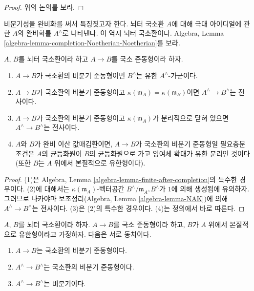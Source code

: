 \begin{proof}
위의 논의를 보라.
\end{proof}

\noindent
비분기성을 완비화를 써서 특징짓고자 한다. 뇌터 국소환 $A$에 대해
극대 아이디얼에 관한 $A$의 완비화를 $A^\wedge$로 나타낸다.
이 역시 뇌터 국소환이다. Algebra, Lemma
\ref{algebra-lemma-completion-Noetherian-Noetherian}를 보라.

\begin{lemma}
\label{lemma-unramified-completions}
$A$, $B$를 뇌터 국소환이라 하고 $A \to B$를 국소 준동형이라 하자.
\begin{enumerate}
\item $A \to B$가 국소환의 비분기 준동형이면 $B^\wedge$는
유한 $A^\wedge$-가군이다.
\item $A \to B$가 국소환의 비분기 준동형이고
$\kappa(\mathfrak m_A) = \kappa(\mathfrak m_B)$이면
$A^\wedge \to B^\wedge$는 전사이다.
\item $A \to B$가 국소환의 비분기 준동형이고
$\kappa(\mathfrak m_A)$가 분리적으로 닫혀 있으면
$A^\wedge \to B^\wedge$는 전사이다.
\item $A$와 $B$가 완비 이산 값매김환이면, $A \to B$가 국소환의
비분기 준동형일 필요충분조건은 $A$의 균등화원이 $B$의 균등화원으로
가고 잉여체 확대가 유한 분리인 것이다(또한 $B$는 $A$ 위에서
본질적으로 유한형이다).
\end{enumerate}
\end{lemma}

\begin{proof}
(1)은 Algebra, Lemma
\ref{algebra-lemma-finite-after-completion}의 특수한 경우이다.
(2)에 대해서는 $\kappa(\mathfrak m_A)$-벡터공간
$B^\wedge/\mathfrak m_{A^\wedge}B^\wedge$가 $1$에 의해 생성됨에
유의하자. 그러므로 나카야마 보조정리(Algebra, Lemma
\ref{algebra-lemma-NAK})에 의해 $A^\wedge \to B^\wedge$는 전사이다.
(3)은 (2)의 특수한 경우이다. (4)는 정의에서 바로 따른다.
\end{proof}

\begin{lemma}
\label{lemma-characterize-unramified-completions}
$A$, $B$를 뇌터 국소환이라 하자. $A \to B$를 국소 준동형이라 하고,
$B$가 $A$ 위에서 본질적으로 유한형이라고 가정하자. 다음은 서로 동치이다.
\begin{enumerate}
\item $A \to B$는 국소환의 비분기 준동형이다.
\item $A^\wedge \to B^\wedge$는 국소환의 비분기 준동형이다.
\item $A^\wedge \to B^\wedge$는 비분기이다.
\end{enumerate}
\end{lemma}


